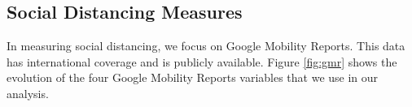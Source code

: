 \documentclass[3p, longtitle]{elsarticle}
\theoremstyle{definition}
\begin{document}

\FloatBarrier

\subsection{Social Distancing Measures}

In measuring social distancing, we focus on Google Mobility
Reports. This data has international coverage and is publicly
available. Figure \ref{fig:gmr} shows the evolution of the four Google
Mobility Reports variables that we use in our analysis.
\end{document}
